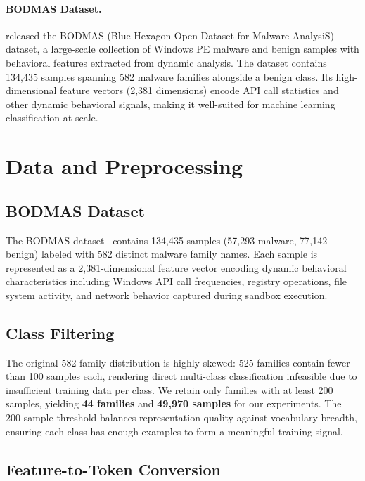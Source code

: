 \documentclass[11pt]{article}
\begin{document}
\paragraph{BODMAS Dataset.}
\citet{yang2021bodmas} released the BODMAS (Blue Hexagon Open Dataset
for Malware AnalysiS) dataset, a large-scale collection of Windows PE
malware and benign samples with behavioral features extracted from
dynamic analysis. The dataset contains 134,435 samples spanning 582
malware families alongside a benign class. Its high-dimensional feature
vectors (2,381 dimensions) encode API call statistics and other dynamic
behavioral signals, making it well-suited for machine learning
classification at scale.

\section{Data and Preprocessing}
\label{sec:data}

\subsection{BODMAS Dataset}

The BODMAS dataset~\citep{yang2021bodmas} contains 134,435 samples
(57,293 malware, 77,142 benign) labeled with 582 distinct malware family
names. Each sample is represented as a 2,381-dimensional feature vector
encoding dynamic behavioral characteristics including Windows API call
frequencies, registry operations, file system activity, and network
behavior captured during sandbox execution.

\subsection{Class Filtering}

The original 582-family distribution is highly skewed: 525 families
contain fewer than 100 samples each, rendering direct multi-class
classification infeasible due to insufficient training data per class.
We retain only families with at least 200 samples, yielding \textbf{44
families} and \textbf{49,970 samples} for our experiments. The 200-sample
threshold balances representation quality against vocabulary breadth,
ensuring each class has enough examples to form a meaningful training
signal.

\subsection{Feature-to-Token Conversion}
\end{document}
